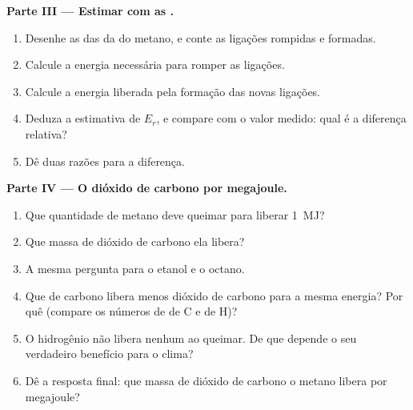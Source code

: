 \begin{problem}
\medskip
\noindent\textbf{Parte III --- Estimar com as .}
\begin{enumerate}[resume]
  \item Desenhe as  das  da  do
        metano, e conte as ligações rompidas e formadas.
  \item Calcule a energia necessária para romper as ligações.
  \item Calcule a energia liberada pela formação das novas ligações.
  \item Deduza a estimativa de $E_r$, e compare com o valor medido: qual
        é a diferença relativa?
  \item Dê duas razões para a diferença.
\end{enumerate}

\medskip
\noindent\textbf{Parte IV --- O dióxido de carbono por megajoule.}
\begin{enumerate}[resume]
  \item Que quantidade de metano deve queimar para liberar \qty{1}{MJ}?
  \item Que massa de dióxido de carbono ela libera?
  \item A mesma pergunta para o etanol e o octano.
  \item Que  de carbono libera menos dióxido de carbono para a
        mesma energia? Por quê (compare os números de  de C e de
        H)?
  \item O hidrogênio não libera nenhum ao queimar. De que depende o seu
        verdadeiro benefício para o clima?
  \item Dê a resposta final: que massa de dióxido de carbono o metano
        libera por megajoule?
\end{enumerate}
\end{problem}
